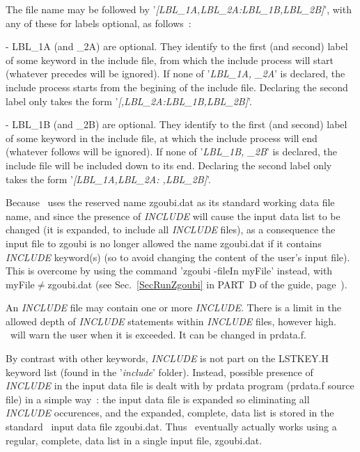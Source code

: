 {\medskip

\noindent The file name may be followed by '\textsl{[LBL\_1A,LBL\_2A:LBL\_1B,LBL\_2B]}', with any of these for 
labels optional, as follows~: 

- LBL\_1A (and \_2A) are optional. They identify to the first (and second) label of some 
keyword in the include file, from which the include process will start (whatever precedes will be ignored). 
If none of '\textsl{LBL\_1A, \_2A}' is declared, the include process starts from the begining of the include file. 
Declaring the second label only takes the form '\textsl{[,LBL\_2A:LBL\_1B,LBL\_2B]}'.  

- LBL\_1B (and \_2B) are optional. They identify to the first (and second) label of some 
keyword in the include file, at which the include process will end (whatever follows will be ignored).  
If none of '\textsl{LBL\_1B, \_2B}' is declared,  the  include file will be included down to its end. 
Declaring the second label only takes the form '\textsl{[LBL\_1A,LBL\_2A: ,LBL\_2B]}'.  

\medskip

\noindent Because \zgoubi\ uses the reserved name zgoubi.dat as its standard working data file name,  
and since  the presence of \textsl{INCLUDE} will cause the input data list to be changed (it is expanded, 
to include all \textsl{INCLUDE} files), as a consequence the input file to zgoubi is no longer allowed the name zgoubi.dat 
if it contains  \textsl{INCLUDE}  keyword(s) (so to avoid changing the content of the user's 
input file). This is overcome by using the command 'zgoubi -fileIn myFile' instead, with myFile$\neq$zgoubi.dat 
(see Sec.~\ref{SecRunZgoubi} in PART~D of the guide, page~\pageref{SecRunZgoubi}). 


\medskip 

\noindent An \textsl{INCLUDE} file may contain one or more \textsl{INCLUDE}. There is a limit in the 
 allowed depth of \textsl{INCLUDE} statements within \textsl{INCLUDE} files, 
however high. \zgoubi\ will warn the user when it is exceeded. It can 
be changed in prdata.f.


\medskip 

\noindent By contrast with other keywords, \textsl{INCLUDE} is not part on the LSTKEY.H keyword list (found 
in the '\textsl{include}' folder). Instead, possible presence of \textsl{INCLUDE} in the input data file is dealt with by 
prdata program (prdata.f source file) in a simple way~: the input data file is expanded so eliminating 
all \textsl{INCLUDE} occurences, and the expanded, complete, data list is stored  in the standard \zgoubi\ input 
data file zgoubi.dat. Thus \zgoubi\ eventually actually works using a regular, complete, data list in 
a single input file, zgoubi.dat. 

}

